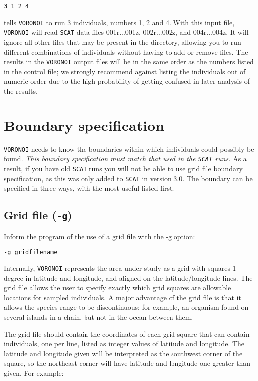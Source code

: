 \documentclass[10pt,titlepage,times,letterpaper]{article}
\def\SCAT{{\tt SCAT} }
\def\VORONOI{{\tt VORONOI} }
\begin{document}
{\tt 3 1 2 4}

tells \VORONOI to run 3 individuals, numbers 1, 2 and 4.  
With this input file, \VORONOI will read \SCAT data files 001r...001z, 002r...002z, and 004r...004z.
It will ignore all other files that may be present in the directory, allowing you to run different 
combinations of individuals without having to add or remove files.  The results in the \VORONOI
output files will be in the same order as the numbers listed in the control file; we strongly
recommend against listing the individuals out of numeric order due to the high probability
of getting confused in later analysis of the results.

\section{Boundary specification}

\VORONOI needs to know the boundaries within which individuals could possibly be found. {\it This boundary
specification must match that used in the \SCAT runs.}  As a result, if you have old \SCAT runs you
will not be able to use grid file boundary specification, as this was only added to \SCAT in version 3.0.
The boundary can be specified in three ways, with the most useful listed first.

\subsection{Grid file ({\tt -g})}

Inform the program of the use of a grid file with the -g option:

\medskip
{\noindent
{\tt -g gridfilename}
}
\medskip

Internally, \VORONOI represents the area under study as a grid with squares 1 degree in latitude
and longitude, and aligned on the latitude/longitude lines.  The grid file allows the user to
specify exactly which grid squares are allowable locations for sampled individuals.  A major
advantage of the grid file is that it allows the species range to be discontinuous:  for example, 
an organism found on several islands in a chain, but not in the ocean between them. 

The grid file should contain the coordinates of each grid square that can contain individuals,
one per line, listed as integer values of latitude and longitude. 
The latitude and longitude given will be interpreted as the southwest
corner of the square, so the northeast corner will have latitude and longitude 
one greater than given.  For example:
\end{document}
